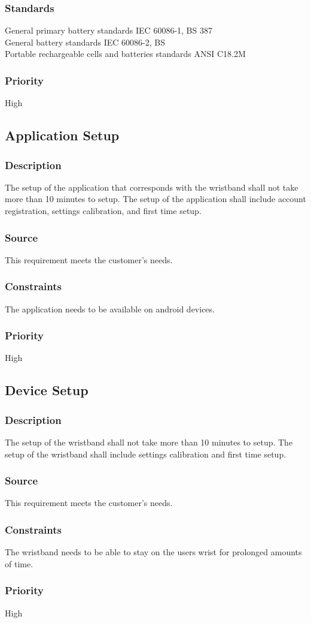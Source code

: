 \subsubsection{Standards}
General primary battery standards IEC 60086-1, BS 387
\\General battery standards IEC 60086-2, BS	
\\Portable rechargeable cells and batteries standards ANSI C18.2M
\subsubsection{Priority}
High

\subsection{Application Setup}
\subsubsection{Description}
The setup of the application that corresponds with the wristband shall not take more than 10 minutes to setup. The setup of the application shall include account registration, settings calibration, and first time setup. 
\subsubsection{Source}
This requirement meets the customer's needs.
\subsubsection{Constraints}
The application needs to be available on android devices.
\subsubsection{Priority}
High

\subsection{Device Setup}
\subsubsection{Description}
The setup of the wristband shall not take more than 10 minutes to setup. The setup of the wristband shall include settings calibration and first time setup. 
\subsubsection{Source}
This requirement meets the customer's needs.
\subsubsection{Constraints}
The wristband needs to be able to stay on the users wrist for prolonged amounts of time. 
\subsubsection{Priority}
High